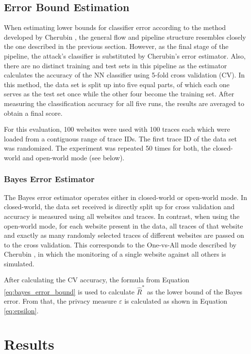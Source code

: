 \documentclass[
	ruledheaders=chapter,
	class=report,
	thesis={type=master, department=inf},
	accentcolor=1c,
	custommargins=true,
	marginpar=false,
	parskip=half-,
	fontsize=11pt,
]{tudapub}
\begin{document}
	\section{Error Bound Estimation}
	\label{error_bound_estimation}

	When estimating lower bounds for classifier error according to the method developed by Cherubin \cite{Cherubin2017}, the general flow and pipeline structure resembles closely the one described in the previous section. However, as the final stage of the pipeline, the attack's classifier is substituted by Cherubin's error estimator. Also, there are no distinct training and test sets in this pipeline as the estimator calculates the accuracy of the NN classifier using 5-fold cross validation (CV). In this method, the data set is split up into five equal parts, of which each one serves as the test set once while the other four become the training set. After measuring the classification accuracy for all five runs, the results are averaged to obtain a final score.
	
	For this evaluation, 100 websites were used with 100 traces each which were loaded from a contiguous range of trace IDs. The first trace ID of the data set was randomized. The experiment was repeated 50 times for both, the closed-world and open-world mode (see below).
	
	\subsection{Bayes Error Estimator}
	
	The Bayes error estimator operates either in closed-world or open-world mode. In closed-world, the data set received is directly split up for cross validation and accuracy is measured using all websites and traces. In contrast, when using the open-world mode, for each website present in the data, all traces of that website and exactly as many randomly selected traces of different websites are passed on to the cross validation. This corresponds to the One-vs-All mode described by Cherubin \cite{Cherubin2017}, in which the monitoring of a single website against all others is simulated.
	
	After calculating the CV accuracy, the formula from Equation \ref{eq:bayes_error_bound} is used to calculate $\widehat{R}^*$ as the lower bound of the Bayes error. From that, the privacy measure $\varepsilon$ is calculated as shown in Equation \ref{eq:epsilon}.

	\chapter{Results}
	\label{results}
	
\end{document}
